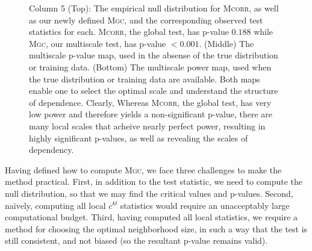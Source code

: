 \documentclass[11pt]{article}
\providecommand{\sct}[1]{{\normalfont\textsc{#1}}}
\providecommand{\mc}[1]{\mathcal{#1}}
\newcommand{\G}{c}
\newcommand{\Mgc}{\sct{Mgc}}
\newcommand{\Mcorr}{\sct{Mcorr}}
\begin{document}
\begin{figure}[htbp]
{Column 5 (Top): The empirical null distribution for \Mcorr, as well as our newly defined \Mgc, and the corresponding observed test statistics for each. \Mcorr, the global test, has  p-value $0.188$ while \Mgc, our multiscale test, has  p-value $<0.001$.
(Middle) The multiscale p-value map, used in the absense of the true distribution or training data. 
(Bottom) The multiscale power map, used when the true distribution or training data are available.  Both maps enable one to select the optimal scale and understand the structure of dependence.
Clearly, 
Whereas \Mcorr, the global test, has very low power and therefore yields a non-significant p-value,  there are many local scales that acheive nearly perfect power, resulting in highly significant p-values, as well as revealing the scales of dependency.
}
\label{f:schematic}
\end{figure}
%

Having defined how to compute \Mgc, we face three challenges to make the method practical. First, in addition to the test statistic, we need to compute the null distribution, so that we may find the critical values and p-values.
Second, na\"ively, computing all local $\G^{kl}$ statistics would require an unacceptably large computational budget.
Third, having computed all local statistics, we require a method for choosing the optimal neighborhood size, in such a way that the test is still consistent, and not biased (so the resultant p-value remains valid).
\end{document}
